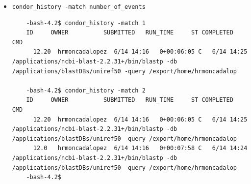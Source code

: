 \documentclass{article}
\begin{document}
\begin{itemize}
\item \verb+condor_history -match number_of_events+
\tiny
\begin{verbatim}
    -bash-4.2$ condor_history -match 1
    ID     OWNER          SUBMITTED   RUN_TIME     ST COMPLETED   CMD            
      12.20  hrmoncadalopez  6/14 14:16   0+00:06:05 C   6/14 14:25 /applications/ncbi-blast-2.2.31+/bin/blastp -db /applications/blastDBs/uniref50 -query /export/home/hrmoncadalop
      
    -bash-4.2$ condor_history -match 2
    ID     OWNER          SUBMITTED   RUN_TIME     ST COMPLETED   CMD            
      12.20  hrmoncadalopez  6/14 14:16   0+00:06:05 C   6/14 14:25 /applications/ncbi-blast-2.2.31+/bin/blastp -db /applications/blastDBs/uniref50 -query /export/home/hrmoncadalop
      12.0   hrmoncadalopez  6/14 14:16   0+00:07:58 C   6/14 14:24 /applications/ncbi-blast-2.2.31+/bin/blastp -db /applications/blastDBs/uniref50 -query /export/home/hrmoncadalop
    -bash-4.2$ 
\end{verbatim}
\normalsize


\end{itemize}
\end{document}
